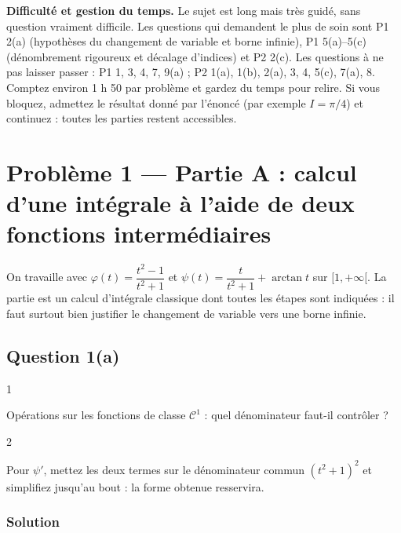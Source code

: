 \documentclass[11pt,a4paper]{article}
\begin{document}
\textbf{Difficulté et gestion du temps.} Le sujet est long mais très guidé, sans question vraiment difficile. Les questions qui demandent le plus de soin sont P1 2(a) (hypothèses du changement de variable et borne infinie), P1 5(a)--5(c) (dénombrement rigoureux et décalage d'indices) et P2 2(c). Les questions à ne pas laisser passer : P1 1, 3, 4, 7, 9(a) ; P2 1(a), 1(b), 2(a), 3, 4, 5(c), 7(a), 8. Comptez environ 1 h 50 par problème et gardez du temps pour relire. Si vous bloquez, admettez le résultat donné par l'énoncé (par exemple \(I=\pi/4\)) et continuez : toutes les parties restent accessibles.

\hypertarget{probluxe8me-1-partie-a-calcul-dune-intuxe9grale-uxe0-laide-de-deux-fonctions-intermuxe9diaires}{%
\section{Problème 1 --- Partie A : calcul d'une intégrale à l'aide de deux fonctions intermédiaires}\label{probluxe8me-1-partie-a-calcul-dune-intuxe9grale-uxe0-laide-de-deux-fonctions-intermuxe9diaires}}

On travaille avec \(\varphi(t)=\dfrac{t^2-1}{t^2+1}\) et \(\psi(t)=\dfrac{t}{t^2+1}+\arctan t\) sur \([1,+\infty[\). La partie est un calcul d'intégrale classique dont toutes les étapes sont indiquées : il faut surtout bien justifier le changement de variable vers une borne infinie.

\hypertarget{question-1a}{%
\subsection{Question 1(a)}\label{question-1a}}

\begin{indication}{1}

Opérations sur les fonctions de classe \(\mathcal C^1\) : quel dénominateur faut-il contrôler ?

\end{indication}

\begin{indication}{2}

Pour \(\psi'\), mettez les deux termes sur le dénominateur commun \((t^2+1)^2\) et simplifiez jusqu'au bout : la forme obtenue resservira.

\end{indication}

\hypertarget{solution}{%
\subsubsection{Solution}\label{solution}}
\end{document}
